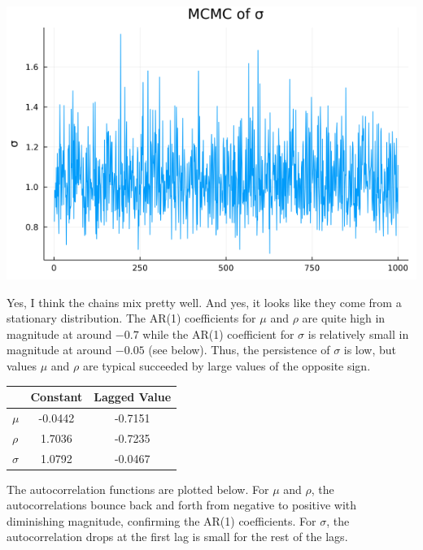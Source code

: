 \documentclass{article}
\begin{document}
\begin{enumerate}
\begin{center}
\includegraphics[scale=0.5]{p2_q3_sigma.png}

\end{center}

Yes, I think the chains mix pretty well. And yes, it looks like they come from a stationary distribution. The AR(1) coefficients for $\mu$ and $\rho$ are quite high in magnitude at around $-0.7$ while the AR(1) coefficient for $\sigma$ is relatively small in magnitude at around $-0.05$ (see below).  Thus, the persistence of $\sigma$ is low, but values $\mu$ and $\rho$ are typical succeeded by large values of the opposite sign.

\begin{center}
\begin{tabular}{ l | c c }
& Constant & Lagged Value \\ 
\hline
$\mu$  & -0.0442 & -0.7151 \\  
$\rho$ & 1.7036 & -0.7235  \\
$\sigma$ & 1.0792 & -0.0467
\end{tabular}
\end{center}

\pagebreak

The autocorrelation functions are plotted below. For $\mu$ and $\rho$, the autocorrelations bounce back and forth from negative to positive with diminishing magnitude, confirming the AR(1) coefficients.  For $\sigma$, the autocorrelation drops at the first lag is small for the rest of the lags.

\begin{center}


\end{center}
\end{enumerate}
\end{document}
